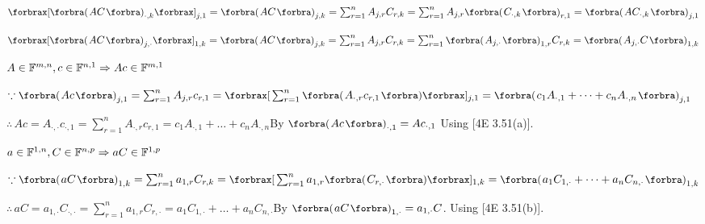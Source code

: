 \BulletPointX\NoteForSmall{[3.49]} $\XSbra{\BigPar{AC}_{\cdot,k}}_{j,1}=\BigPar{AC}_{j,k}=\sum_{r=1}^n A_{j,r}C_{r,k}=\sum_{r=1}^n A_{j,r}\BigPar{C_{\cdot,k}}_{r,1}=\BigPar{AC_{\cdot,k}}_{j,1}$\PfEnd
\SepLine

\BulletPointX{} $\XSbra{\BigPar{AC}_{j,\cdot}}_{1,k}=\BigPar{AC}_{j,k}=\sum_{r=1}^n A_{j,r}C_{r,k}=\sum_{r=1}^n \BigPar{A_{j,\cdot}}_{1,r}C_{r,k}=\BigPar{A_{j,\cdot}C}_{1,k}$\PfEnd
\SepLine

\BulletPointX{}\quad $A\in{\mathbb{F}}^{m,n},c\in{\mathbb{F}}^{n,1}\Rightarrow Ac\in{\mathbb{F}}^{m,1}$\vspace{2pt}\par\quad
$\because\BigPar{Ac}_{j,1}=\sum_{r=1}^n A_{j,r}c_{r,1}=\XSbra{\sum_{r=1}^n\BigPar{A_{\cdot,r}c_{r,1}}}{_{j,1}}=\BigPar{c_1 A_{\cdot,1}+\dots+c_n A_{\cdot,n}}_{j,1}$\vspace{3pt}\par\quad
$\therefore\,Ac=A_{\cdot,\cdot}c_{\cdot,1}=\sum_{r=1}^n A_{\cdot,r}c_{r,1}=c_1 A_{\cdot,1}+\dots+c_n A_{\cdot,n}$\quad \Or By $\BigPar{Ac}_{\cdot,1}=Ac_{\cdot,1}$ Using [4E 3.51(a)].\PfEnd
\SepLine

\BulletPointX{}\quad$a\in{\mathbb{F}}^{1,n},C\in{\mathbb{F}}^{n,p}\Rightarrow aC\in{\mathbb{F}}^{1,p}$\vspace{2pt}\par\quad
$\because\BigPar{aC}_{1,k}=\sum_{r=1}^n a_{1,r}C_{r,k}=\XSbra{\sum_{r=1}^n a_{1,r}\BigPar{C_{r,\cdot}}}{_{1,k}}=\BigPar{a_1 C_{1,\cdot}+\dots+a_n C_{n,\cdot}}_{1,k}$\vspace{3pt}\par\quad
$\therefore\,aC=a_{1,\cdot}C_{\cdot,\cdot}=\sum_{r=1}^n a_{1,r}C_{r,\cdot}=a_1 C_{1,\cdot}+\dots+a_n C_{n,\cdot}$\quad \Or By $\BigPar{aC}_{1,\cdot}=a_{1,\cdot}C$. Using [4E 3.51(b)].\PfEnd
\SepLine

